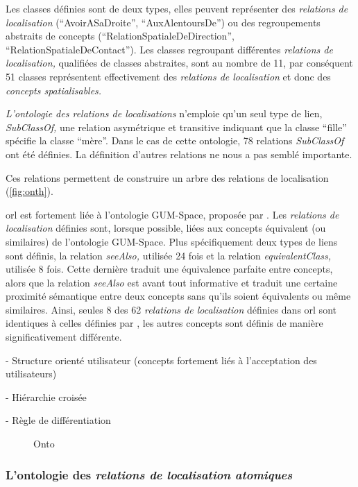 Les classes définies sont de deux types, elles peuvent représenter des
\emph{relations de localisation} (\eg \enquote{AvoirASaDroite},
\enquote{AuxAlentoursDe}) ou des regroupements abstraits de concepts
(\eg \enquote{RelationSpatialeDeDirection},
\enquote{RelationSpatialeDeContact}). Les classes regroupant
différentes \emph{relations de localisation,} qualifiées de classes
abstraites, sont au nombre de 11, par conséquent 51 classes
représentent effectivement des \emph{relations de localisation} et
donc des \emph{concepts spatialisables.}

\emph{L'ontologie des relations de localisations} n'emploie qu'un seul
type de lien, \emph{SubClassOf,} une relation asymétrique et
transitive indiquant que la classe \enquote{fille} spécifie la classe
\enquote{mère}. Dans le cas de cette ontologie, 78 relations
\emph{SubClassOf} ont été définies. La définition d'autres relations
ne nous a pas semblé importante.

Ces relations permettent de
construire un arbre des relations de localisation
(\autoref{fig:onth}).


\ac{orl} est fortement liée à l'ontologie GUM-Space, proposée par
\textcite{Bateman2010}. Les \emph{relations de localisation} définies
sont, lorsque possible, liées aux concepts équivalent (ou similaires)
de l'ontologie GUM-Space. Plus spécifiquement deux types de liens sont
définis, la relation \emph{seeAlso,} utilisée 24 fois et la relation
\emph{equivalentClass,} utilisée 8 fois. Cette dernière traduit une
équivalence parfaite entre concepts, alors que la relation
\emph{seeAlso} est avant tout informative et traduit une certaine
proximité sémantique entre deux concepts sans qu'ils soient
équivalents ou même similaires. Ainsi, seules 8 des 62 \emph{relations
  de localisation} définies dans \ac{orl} sont identiques à celles
définies par \textcite{Bateman2010}, les autres concepts sont définis
de manière significativement différente.


- Structure orienté utilisateur (concepts fortement liés à
l'acceptation des utilisateurs)

- Hiérarchie croisée

- Règle de différentiation

\begin{figure}
  \centering
  
  \caption{Onto}
  \label{fig:ontho}
\end{figure}

\subsubsection{L'ontologie des \emph{relations de localisation atomiques}}


